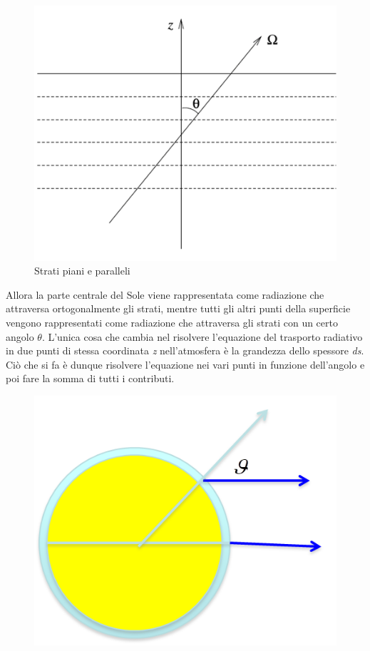 \documentclass[a4paper,11pt]{article}
\begin{document}
\begin{figure}[h]
    \centering
    \includegraphics{strati piani.png}
    \caption{Strati piani e paralleli}
\end{figure}

Allora la parte centrale del Sole viene rappresentata come radiazione che attraversa ortogonalmente gli strati, mentre tutti gli altri punti della superficie vengono rappresentati come radiazione che attraversa gli strati con un certo angolo $\theta$. L'unica cosa che cambia nel risolvere l'equazione del trasporto radiativo in due punti di stessa coordinata \textit{z} nell'atmosfera è la grandezza dello spessore \textit{ds}. \\
Ciò che si fa è dunque risolvere l'equazione nei vari punti in funzione dell'angolo e poi fare la somma di tutti i contributi. 

\begin{figure}[h]
    \centering
    \includegraphics{angolo.png}
\end{figure}
\end{document}
